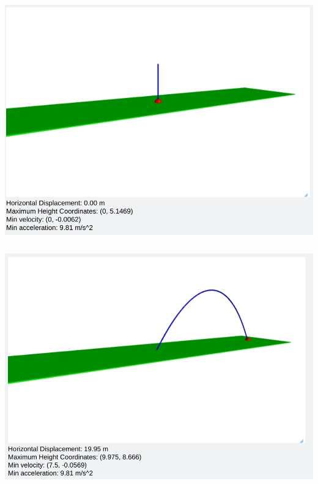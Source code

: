 \documentclass[12pt]{article}
\begin{document}
\begin{center}
\includegraphics[height=4in]{./straightup.png}
\end{center}

\begin{center}
\includegraphics[height=4in]{./15ms.png}
\end{center}
\end{document}
